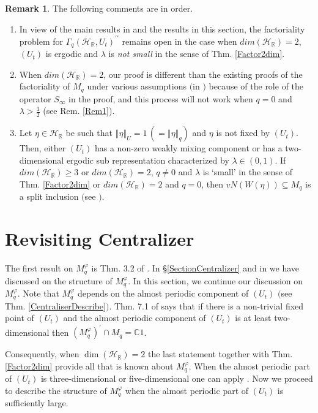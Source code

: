 \documentclass[12pt, a4paper,reqno]{amsart}
\theoremstyle{definition}
\newtheorem{Remark}[Theorem]{Remark}
\renewcommand{\geq}{\geqslant}
\def\C{\mathbb C}
\def\R{\mathbb R}
\newcommand{\CH}{\mathcal{H}}
\newcommand{\norm}[1]{\left\Vert#1\right\Vert}
\begin{document}
\begin{Remark}\label{opencase}
The following comments are in order. 
\begin{enumerate}
\item In view of the main results in \cite{bik-kunal,ER} and the results in this section, the factoriality problem for $\Gamma_q(\CH_\R, U_t)^{\prime\prime}$ remains open  in the case when $dim(\CH_\R)=2$, $(U_t)$ is ergodic and $\lambda$ is \textit{not small} in the sense of Thm. \ref{Factor2dim}.
%
\item When $dim(\CH_\R)=2$, our proof is different than the existing proofs of the factoriality of $M_q$ under various assumptions $($in \cite{bik-kunal,Hiai,ER,Shlyakhtenko, Ne15}$)$ because of the role of the operator $S_\infty$ in the proof, and this process will not work when $q=0$ and $\lambda>\frac 12$ (see Rem. \ref{Rem1}). 
%
\item Let $\eta\in\CH_\R$ be such that $\norm{\eta}_{U}= 1\,(=\norm{\eta}_q)$ and $\eta$ is not fixed by $(U_t)$.  Then, either $(U_t)$ has a non-zero weakly mixing component or has a two-dimensional ergodic sub representation characterized by $\lambda\in (0,1)$. If $dim(\CH_\R)\geq 3$ or $dim(\CH_\R)=2$, $q\neq 0$ and $\lambda$ is `small' in the sense of Thm. \ref{Factor2dim} or $dim(\CH_\R)=2$ and $q=0$, then $vN(W(\eta))\subseteq M_q$ is a split inclusion $($see \cite[Thm. 4.6]{BM2}$)$. 
\end{enumerate}
\end{Remark}



\section{Revisiting Centralizer}\label{cent_irreducibel}

The first result on $M_q^\varphi$ is Thm. 3.2 of \cite{Hiai}. In \S\ref{SectionCentralizer} and in \cite[\S7]{bik-kunal} we have discussed on the structure of $M_q^\varphi$. In this section, we continue our discussion on $M_q^\varphi$. Note that $M_q^\varphi$ depends on the almost periodic component of $(U_t)$ $($see Thm. \ref{CentraliserDescribe}$)$. Thm. 7.1 of \cite{bik-kunal} says that if there is a non-trivial fixed point of $(U_t)$ and the almost periodic component of $(U_t)$ is at least two-dimensional then $(M_q^\varphi)^\prime\cap M_q =\C1$. 

Consequently, when $\dim(\CH_\R)=2$ the last statement together with Thm. \ref{Factor2dim} provide all that is known about $M_q^\varphi$. When the almost periodic part of $(U_t)$ is three-dimensional or five-dimensional one can apply \cite[Thm. 7.1]{bik-kunal}. Now we proceed to describe the structure of $M_q^\varphi$ when the almost periodic part of $(U_t)$ is sufficiently large. 
\end{document}
